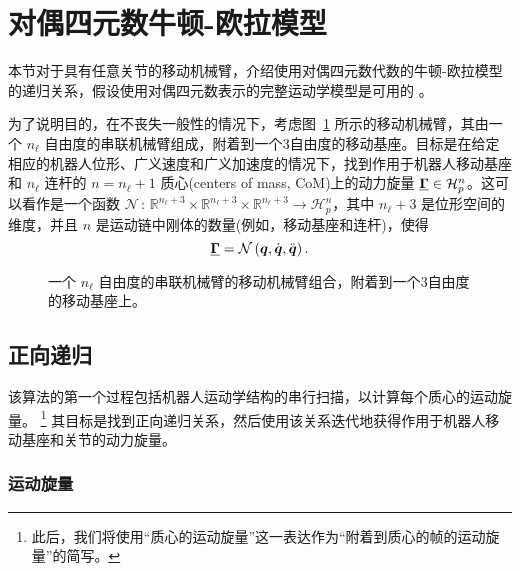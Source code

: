 %

\section{\normalfont\bfseries 对偶四元数牛顿-欧拉模型 \label{sec:Newton-Euler-Model}}

本节对于具有任意关节的移动机械臂，介绍使用对偶四元数代数的牛顿-欧拉模型的递归关系，假设使用对偶四元数表示的完整运动学模型是可用的 \cite{Adorno2011}。

为了说明目的，在不丧失一般性的情况下，考虑图~\ref{fig:mobile_nDOF_robot} 所示的移动机械臂，其由一个 $n_{\ell}$ 自由度的串联机械臂组成，附着到一个$3$自由度的移动基座。目标是在给定相应的机器人位形、广义速度和广义加速度的情况下，找到作用于机器人移动基座和 $n_{\ell}$ 连杆的 $n=n_{\ell}+1$ 质心(centers of mass, CoM)上的动力旋量 $\underline{\boldsymbol{\Gamma}}\in\mathcal{H}_{p}^{n}$。这可以看作是一个函数 $\mathcal{N}\,:\,\mathbb{R}^{n_{\ell}+3}\times\mathbb{R}^{n_{\ell}+3}\times\mathbb{R}^{n_{\ell}+3}\rightarrow\mathcal{H}_{p}^{n}$，其中 $n_{\ell}+3$ 是位形空间的维度，并且 $n$ 是运动链中刚体的数量(例如，移动基座和连杆)，使得
\begin{equation}
\underline{\boldsymbol{\Gamma}}=\mathcal{N}\left(\boldsymbol{q},\dot{\boldsymbol{q}},\ddot{\boldsymbol{q}}\right).\label{eq:dq_NE_as_a_function}
\end{equation}
\begin{figure}[t]
\def\svgwidth{2.5\columnwidth}
\noindent \begin{centering}
{\Huge{}\resizebox{0.8\columnwidth}{!}{}}{\Huge\par}
\par\end{centering}
\caption{一个 $n_{\ell}$ 自由度的串联机械臂的移动机械臂组合，附着到一个$3$自由度的移动基座上。\label{fig:mobile_nDOF_robot}}
\end{figure}


\subsection{\normalfont\bfseries 正向递归\label{subsec:Forward-Recursion}}

该算法的第一个过程包括机器人运动学结构的串行扫描，以计算每个质心的运动旋量。
\footnote{此后，我们将使用“质心的运动旋量”这一表达作为“附着到质心的帧的运动旋量”的简写。} 其目标是找到正向递归关系，然后使用该关系迭代地获得作用于机器人移动基座和关节的动力旋量。

\subsubsection{\normalfont\bfseries 运动旋量 \label{subsec:Twists}}

